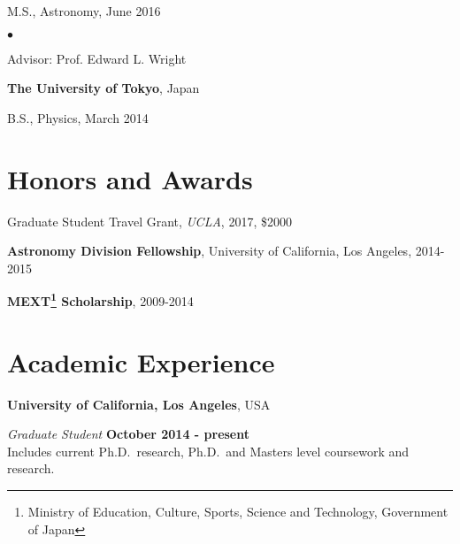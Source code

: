 \documentclass[margin,line]{res}
\newenvironment{list1}{
  \begin{list}{\ding{113}}{%
      \setlength{\itemsep}{0in}
      \setlength{\parsep}{0in} \setlength{\parskip}{0in}
      \setlength{\topsep}{0in} \setlength{\partopsep}{0in} 
      \setlength{\leftmargin}{0.17in}}}{\end{list}}
\newenvironment{list2}{
  \begin{list}{$\bullet$}{%
      \setlength{\itemsep}{0in}
      \setlength{\parsep}{0in} \setlength{\parskip}{0in}
      \setlength{\topsep}{0in} \setlength{\partopsep}{0in} 
      \setlength{\leftmargin}{0.2in}}}{\end{list}}
\begin{document}
\begin{resume}
\begin{list1}
	\item[] M.S., Astronomy,  June 2016
	\begin{list2}
		\vspace*{.05in} 
		\item Advisor:  Prof. Edward L. Wright
	\end{list2}
\end{list1}

{\bf The University of Tokyo}, Japan\\
\vspace*{-.1in}
\begin{list1}
\item[] B.S., Physics,  March 2014
\end{list1}


\section{\sc Honors and Awards} 
Graduate Student Travel Grant, {\it UCLA}, 2017, \$2000

\vspace*{-2.5mm}
\textbf{Astronomy Division Fellowship}, University of California, Los Angeles, 2014-2015 

\vspace*{-2.5mm}
\textbf{MEXT\footnote{Ministry of Education, Culture, Sports, Science and Technology, Government of Japan} Scholarship}, 2009-2014
\section{\sc Academic Experience}
{\bf University of California, Los Angeles}, USA

\vspace{-.3cm}
{\em Graduate Student} \hfill {\bf October 2014 - present}\\
Includes current Ph.D.~research, Ph.D.~and Masters level coursework and
research.




\end{resume}
\end{document}
